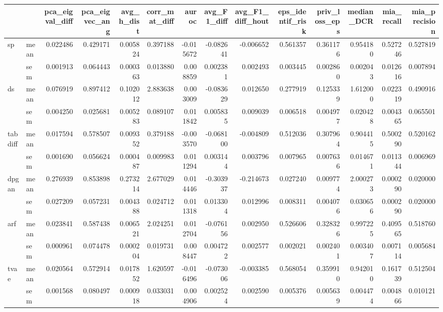 \begin{tabular}{llrrrrrrrrrrrr}
\toprule
 &  & pca_eigval_diff & pca_eigvec_ang & avg_h_dist & corr_mat_diff & auroc & avg_F1_diff & avg_F1_diff_hout & eps_identif_risk & priv_loss_eps & median_DCR & mia_recall & mia_precision \\
\midrule
\multirow[t]{2}{*}{sp} & mean & 0.022486 & 0.429171 & 0.005824 & 0.397188 & -0.015672 & -0.082641 & -0.006652 & 0.561357 & 0.361176 & 0.954180 & 0.527246 & 0.527819 \\
 & sem & 0.001913 & 0.064443 & 0.000363 & 0.013880 & 0.008859 & 0.002381 & 0.002493 & 0.003445 & 0.002860 & 0.002043 & 0.012616 & 0.007894 \\
\cline{1-14}
\multirow[t]{2}{*}{ds} & mean & 0.076919 & 0.897412 & 0.102012 & 2.883638 & 0.003009 & -0.083629 & 0.012650 & 0.277919 & 0.125339 & 1.612000 & 0.022319 & 0.490916 \\
 & sem & 0.004250 & 0.025681 & 0.005283 & 0.089107 & 0.011842 & 0.005835 & 0.009039 & 0.006518 & 0.004977 & 0.020428 & 0.004365 & 0.065501 \\
\cline{1-14}
\multirow[t]{2}{*}{tabdiff} & mean & 0.017594 & 0.578507 & 0.009352 & 0.379188 & -0.003570 & -0.068100 & -0.004809 & 0.512036 & 0.307964 & 0.904415 & 0.500290 & 0.520162 \\
 & sem & 0.001690 & 0.056624 & 0.000487 & 0.009983 & 0.011294 & 0.003144 & 0.003796 & 0.007965 & 0.007636 & 0.014671 & 0.011344 & 0.006969 \\
\cline{1-14}
\multirow[t]{2}{*}{dpgan} & mean & 0.276939 & 0.853898 & 0.273214 & 2.677029 & 0.014446 & -0.303937 & -0.214673 & 0.027240 & 0.009774 & 2.000273 & 0.000290 & 0.020000 \\
 & sem & 0.027209 & 0.057231 & 0.004388 & 0.024712 & 0.011318 & 0.013304 & 0.012996 & 0.008311 & 0.004076 & 0.030656 & 0.000290 & 0.020000 \\
\cline{1-14}
\multirow[t]{2}{*}{arf} & mean & 0.023841 & 0.587438 & 0.006521 & 2.024251 & 0.012704 & -0.076156 & 0.002950 & 0.526606 & 0.328326 & 0.997225 & 0.409565 & 0.518760 \\
 & sem & 0.000961 & 0.074478 & 0.000204 & 0.019731 & 0.008447 & 0.004722 & 0.002577 & 0.002021 & 0.002401 & 0.003407 & 0.007114 & 0.005684 \\
\cline{1-14}
\multirow[t]{2}{*}{tvae} & mean & 0.020564 & 0.572914 & 0.017852 & 1.620597 & -0.016496 & -0.073006 & -0.003385 & 0.568054 & 0.359910 & 0.942010 & 0.161739 & 0.512504 \\
 & sem & 0.001568 & 0.080497 & 0.000918 & 0.033031 & 0.004906 & 0.002524 & 0.002590 & 0.005376 & 0.005639 & 0.004474 & 0.004866 & 0.010121 \\

\end{tabular}
